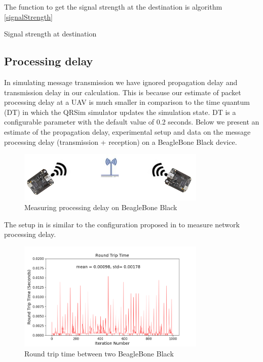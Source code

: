 The function to get the signal strength at the destination is algorithm \ref{signalStrength}
\begin{algorithm}
\caption{Signal strength at destination}
\label{signalStrength}
\DontPrintSemicolon
{}


\end{algorithm} 


\subsection{Processing delay}

In simulating message transmission we have ignored propagation delay and transmission delay in our calculation. This is because our estimate of packet processing delay at a UAV is much smaller in comparison to the time quantum (DT) in which the QRSim simulator updates the simulation state. DT is a configurable parameter with the default value of 0.2 seconds. Below we present an estimate of the propagation delay, experimental setup and data on the message processing delay (transmission + reception) on a BeagleBone Black device.
\begin{figure}[hbtp]
\centering
\includegraphics[width=0.8\textwidth]{Chapter-4/figs/beaglebone}
\caption{Measuring processing delay on BeagleBone Black}
\label{fig:proc_delay_setup}
\end{figure}
The setup in  is similar to the configuration proposed in \cite{1378257} to measure network processing delay.

\begin{figure}[hbtp]
\centering
\includegraphics[width=0.8\textwidth]{Chapter-4/figs/transmission_time}
\caption{Round trip time between two BeagleBone Black}
\label{fig:proc_delay_graph}
\end{figure}

